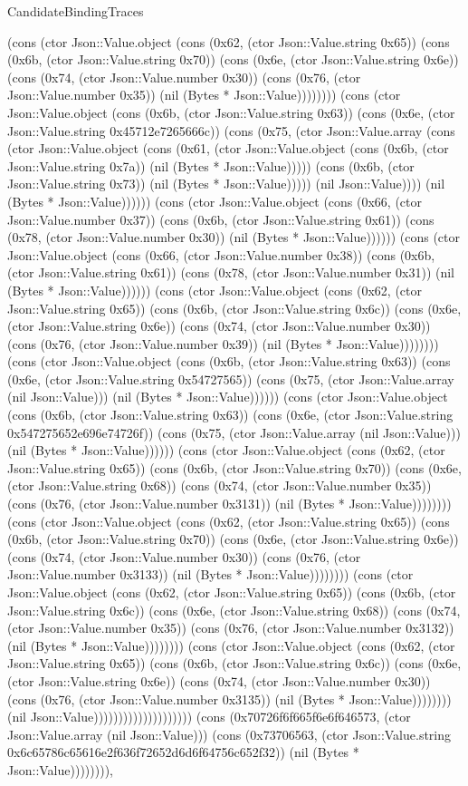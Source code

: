 \begin{lexlean}{CandidateBindingTraces}
\begin{semanticmodule}
{(cons (ctor Json::Value.object (cons (0x62, (ctor Json::Value.string 0x65)) (cons (0x6b, (ctor Json::Value.string 0x70)) (cons (0x6e, (ctor Json::Value.string 0x6e)) (cons (0x74, (ctor Json::Value.number 0x30)) (cons (0x76, (ctor Json::Value.number 0x35)) (nil (Bytes * Json::Value)))))))) (cons (ctor Json::Value.object (cons (0x6b, (ctor Json::Value.string 0x63)) (cons (0x6e, (ctor Json::Value.string 0x45712e7265666c)) (cons (0x75, (ctor Json::Value.array (cons (ctor Json::Value.object (cons (0x61, (ctor Json::Value.object (cons (0x6b, (ctor Json::Value.string 0x7a)) (nil (Bytes * Json::Value))))) (cons (0x6b, (ctor Json::Value.string 0x73)) (nil (Bytes * Json::Value))))) (nil Json::Value)))) (nil (Bytes * Json::Value)))))) (cons (ctor Json::Value.object (cons (0x66, (ctor Json::Value.number 0x37)) (cons (0x6b, (ctor Json::Value.string 0x61)) (cons (0x78, (ctor Json::Value.number 0x30)) (nil (Bytes * Json::Value)))))) (cons (ctor Json::Value.object (cons (0x66, (ctor Json::Value.number 0x38)) (cons (0x6b, (ctor Json::Value.string 0x61)) (cons (0x78, (ctor Json::Value.number 0x31)) (nil (Bytes * Json::Value)))))) (cons (ctor Json::Value.object (cons (0x62, (ctor Json::Value.string 0x65)) (cons (0x6b, (ctor Json::Value.string 0x6c)) (cons (0x6e, (ctor Json::Value.string 0x6e)) (cons (0x74, (ctor Json::Value.number 0x30)) (cons (0x76, (ctor Json::Value.number 0x39)) (nil (Bytes * Json::Value)))))))) (cons (ctor Json::Value.object (cons (0x6b, (ctor Json::Value.string 0x63)) (cons (0x6e, (ctor Json::Value.string 0x54727565)) (cons (0x75, (ctor Json::Value.array (nil Json::Value))) (nil (Bytes * Json::Value)))))) (cons (ctor Json::Value.object (cons (0x6b, (ctor Json::Value.string 0x63)) (cons (0x6e, (ctor Json::Value.string 0x547275652e696e74726f)) (cons (0x75, (ctor Json::Value.array (nil Json::Value))) (nil (Bytes * Json::Value)))))) (cons (ctor Json::Value.object (cons (0x62, (ctor Json::Value.string 0x65)) (cons (0x6b, (ctor Json::Value.string 0x70)) (cons (0x6e, (ctor Json::Value.string 0x68)) (cons (0x74, (ctor Json::Value.number 0x35)) (cons (0x76, (ctor Json::Value.number 0x3131)) (nil (Bytes * Json::Value)))))))) (cons (ctor Json::Value.object (cons (0x62, (ctor Json::Value.string 0x65)) (cons (0x6b, (ctor Json::Value.string 0x70)) (cons (0x6e, (ctor Json::Value.string 0x6e)) (cons (0x74, (ctor Json::Value.number 0x30)) (cons (0x76, (ctor Json::Value.number 0x3133)) (nil (Bytes * Json::Value)))))))) (cons (ctor Json::Value.object (cons (0x62, (ctor Json::Value.string 0x65)) (cons (0x6b, (ctor Json::Value.string 0x6c)) (cons (0x6e, (ctor Json::Value.string 0x68)) (cons (0x74, (ctor Json::Value.number 0x35)) (cons (0x76, (ctor Json::Value.number 0x3132)) (nil (Bytes * Json::Value)))))))) (cons (ctor Json::Value.object (cons (0x62, (ctor Json::Value.string 0x65)) (cons (0x6b, (ctor Json::Value.string 0x6c)) (cons (0x6e, (ctor Json::Value.string 0x6e)) (cons (0x74, (ctor Json::Value.number 0x30)) (cons (0x76, (ctor Json::Value.number 0x3135)) (nil (Bytes * Json::Value)))))))) (nil Json::Value)))))))))))))))))))) (cons (0x70726f6f665f6e6f646573, (ctor Json::Value.array (nil Json::Value))) (cons (0x73706563, (ctor Json::Value.string 0x6c65786c65616e2f636f72652d6d6f64756c652f32)) (nil (Bytes * Json::Value)))))))),
}
\end{semanticmodule}
\end{lexlean}
